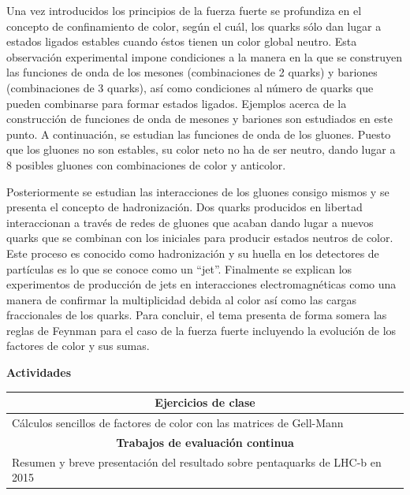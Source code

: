 Una vez introducidos los principios de la fuerza fuerte se profundiza en el concepto de confinamiento de color, según el cuál, los quarks sólo dan lugar a estados ligados estables cuando éstos tienen un color global neutro. Esta observación experimental impone condiciones a la manera en la que se construyen las funciones de onda de los mesones (combinaciones de 2 quarks) y bariones (combinaciones de 3 quarks), así como condiciones al número de quarks que pueden combinarse para formar estados ligados. Ejemplos acerca de la construcción de funciones de onda de mesones y bariones son estudiados en este punto. A continuación, se estudian las funciones de onda de los gluones. Puesto que los gluones no son estables, su color neto no ha de ser neutro, dando lugar a 8 posibles gluones con combinaciones de color y anticolor. 

Posteriormente se estudian las interacciones de los gluones consigo mismos y se presenta el concepto de hadronización. Dos quarks producidos en libertad interaccionan a través de redes de gluones que acaban dando lugar a nuevos quarks que se combinan con los iniciales para producir estados neutros de color. Este proceso es conocido como hadronización y su huella en los detectores de partículas es lo que se conoce como un ``jet''. Finalmente se explican los experimentos de producción de jets en interacciones electromagnéticas como una manera de confirmar la multiplicidad debida al color así como las cargas fraccionales de los quarks. Para concluir, el tema presenta de forma somera las reglas de Feynman para el caso de la fuerza fuerte incluyendo la evolución de los factores de color y sus sumas. 


\textbf{Actividades}

\begin{center}
\begin{tabularx}{\textwidth}{|X|}
\hline\hline
\multicolumn{1}{|c|}{\textbf{Ejercicios de clase}}\\
\hline\hline
Cálculos sencillos de factores de color con las matrices de Gell-Mann\\
\hline\hline
\multicolumn{1}{|c|}{\textbf{Trabajos de evaluación continua}}\\
\hline\hline
Resumen y breve presentación del resultado sobre pentaquarks de LHC-b en 2015 \\
\hline\hline
\end{tabularx}
\end{center}


